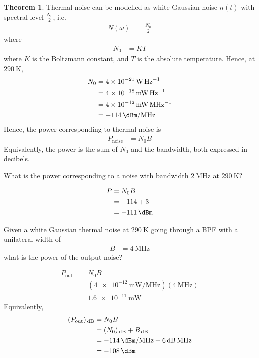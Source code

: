 \documentclass[titlepage, fleqn, a4paper, 12pt, twoside]{article}
\theoremstyle{definition}
\theoremstyle{theorem}
\newtheorem{theorem}{Theorem}
\begin{document}
\begin{theorem}
	Thermal noise can be modelled as white Gaussian noise $n(t)$ with spectral level $\frac{N_0}{2}$, i.e.
	\begin{align*}
		N(\omega) &= \frac{N_0}{2}
	\end{align*}
	where
	\begin{align*}
		N_0 &= K T
	\end{align*}
	where $K$ is the Boltzmann constant, and $T$ is the absolute temperature.
	Hence, at $\SI{290}{\kelvin}$,
	\begin{align*}
		N_0 &= \SI{4e-21}{\watt\per\hertz}\\
		&= \SI{4e-18}{\milli\watt\per\hertz}\\
		&= \SI{4e-12}{\milli\watt\per\mega\hertz}\\
		&= \SI{-114}{\dBm\per\mega\hertz}
	\end{align*}
	Hence, the power corresponding to thermal noise is
	\begin{align*}
		P_{\text{noise}} &= N_0 B
	\end{align*}
	Equivalently, the power is the sum of $N_0$ and the bandwidth, both expressed in decibels.
\end{theorem}

\begin{question}
	What is the power corresponding to a noise with bandwidth $\SI{2}{\mega\hertz}$ at $\SI{290}{\kelvin}$?
\end{question}

\begin{solution}
	\begin{align*}
		P &= N_0 B\\
		&= -114 + 3\\
		&= \SI{-111}{\dBm}
	\end{align*}
\end{solution}

\begin{question}
	Given a white Gaussian thermal noise at $\SI{290}{\kelvin}$ going through a BPF with a unilateral width of
	\begin{align*}
		B &= \SI{4}{\mega\hertz}
	\end{align*}
	what is the power of the output noise?
\end{question}

\begin{solution}
	\begin{align*}
		P_{\text{out}} &= N_0 B\\
		&= \left( \SI{4e-12}{\milli\watt\per\mega\hertz} \right) (\SI{4}{\mega\hertz})\\
		&= \SI{1.6e-11}{\milli\watt}
	\end{align*}
	Equivalently,
	\begin{align*}
		(P_{\text{out}})_{\decibel} &= N_0 B\\
		&= (N_0)_{\decibel} + B_{\decibel}\\
		&= \SI{-114}{\dBm\per\mega\hertz} + \SI{6}{\decibel\mega\hertz}\\
		&= \SI{-108}{\dBm}
	\end{align*}
\end{solution}
\end{document}
